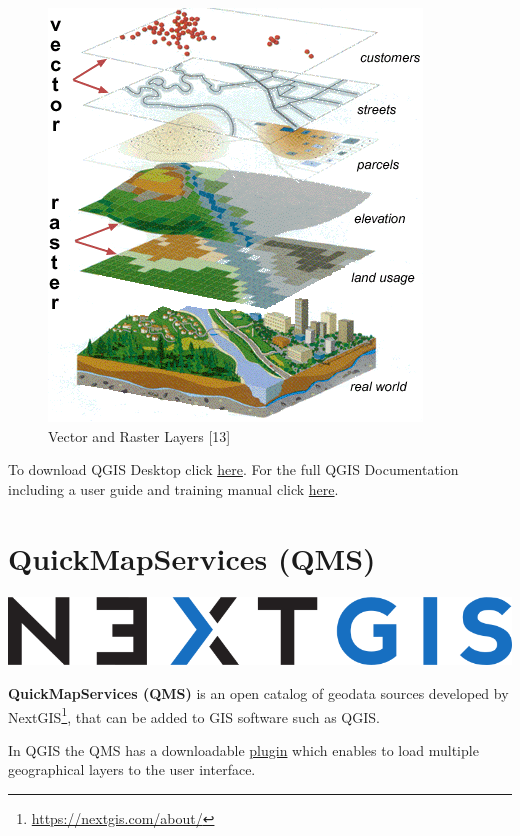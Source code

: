 \documentclass[
]{book}
\begin{document}
\begin{figure}

{\centering \includegraphics[height=0.5\textheight]{images/gis_layers_displayed} 

}

\caption{Vector and Raster Layers [13]}\label{fig:img555}
\end{figure}

To download QGIS Desktop click \href{https://qgis.org/en/site/forusers/download.html}{here}.
For the full QGIS Documentation including a user guide and training manual click \href{https://docs.qgis.org/3.16/en/docs/index.html}{here}.

\hypertarget{quickmapservices-qms}{%
\section{QuickMapServices (QMS)}\label{quickmapservices-qms}}

\begin{center}\includegraphics[width=0.5\linewidth]{images/qms} \end{center}

\textbf{QuickMapServices (QMS)} is an open catalog of geodata sources developed by NextGIS\footnote{\url{https://nextgis.com/about/}}, that can be added to GIS software such as QGIS.

In QGIS the QMS has a downloadable \href{https://plugins.qgis.org/plugins/quick_map_services/}{plugin} which enables to load multiple geographical layers to the user interface.
\end{document}
